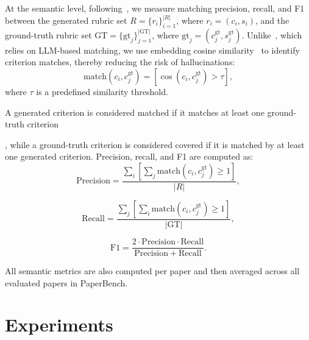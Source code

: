 \documentclass[11pt]{article}
\newif\ifreview
\newcommand{\hh}[1]{%
\ifreview
{\textcolor{orange!90!black}{#1}}
\else
#1
\fi
}
\begin{document}
At the semantic level, following~\citet{zhou-etal-2026-rubricbench}, we measure matching precision, recall, and F1 between the generated rubric set
$R=\{r_i\}_{i=1}^{|R|}$, where $r_i=(c_i,s_i)$, and the ground-truth rubric set
$\mathrm{GT}=\{\mathrm{gt}_j\}_{j=1}^{|\mathrm{GT}|}$, where $\mathrm{gt}_j=(c^{\mathrm{gt}}_j,s^{\mathrm{gt}}_j)$. Unlike~\citet{zhou-etal-2026-rubricbench}, which relies on LLM-based matching, we use embedding cosine similarity~\cite{reimers-gurevych-2019-sentence} to identify criterion matches, thereby reducing the risk of hallucinations:
\begin{equation}
\mathrm{match}(c_i,c^{\mathrm{gt}}_j)
=
[\cos(c_i,c^{\mathrm{gt}}_j) > \tau],
\end{equation}
where $\tau$ is a predefined similarity threshold.

\hh{A generated criterion is considered matched if it matches at least one ground-truth criterion}, while a ground-truth criterion is considered covered if it is matched by at least one generated criterion. Precision, recall, and F1 are computed as:
\begin{equation}
\mathrm{Precision}
=
\frac{
{\sum}_i
\left[
{\sum}_j
\mathrm{match}(c_i,c^{\mathrm{gt}}_j) \geq 1
\right]
}{|R|},
\end{equation}

\begin{equation}
\mathrm{Recall}
=
\frac{
\sum_{j}
\left[
\sum_{i}
\mathrm{match}(c_i,c^{\mathrm{gt}}_j) \geq 1
\right]
}{|\mathrm{GT}|},
\end{equation}

\begin{equation}
\mathrm{F1}
=
\frac{2 \cdot \mathrm{Precision} \cdot \mathrm{Recall}}
{\mathrm{Precision} + \mathrm{Recall}}.
\end{equation}

All semantic metrics are also computed per paper and then averaged across all 
evaluated papers in PaperBench.



\section{Experiments}
\end{document}

